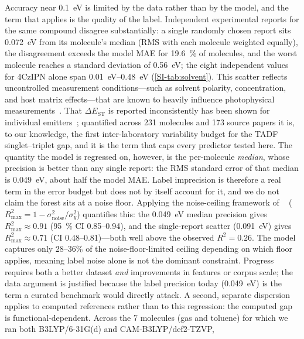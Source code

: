 Accuracy near \qty{0.1}{\electronvolt} is limited by the data rather than by the model,
and the term that applies is the quality of the label.
Independent experimental reports for the same compound disagree
substantially: a single randomly chosen report sits \qty{0.072}{\electronvolt} from its
molecule's median (RMS with each molecule weighted equally), the disagreement exceeds the
model MAE for \qty{19.6}{\percent} of molecules, and the worst molecule reaches a standard
deviation of \qty{0.56}{\electronvolt}; the eight independent values for 4CzIPN alone span
\qtyrange{0.01}{0.48}{\electronvolt} (\cref{SI-tab:solvent}). This scatter reflects uncontrolled measurement conditions---such as solvent polarity, concentration, and host matrix effects---that are known to heavily influence photophysical measurements~\cite{Dang2025}. That $\Delta E_\text{ST}$
is reported inconsistently has been shown for individual emitters~\cite{Shuaib2026};
quantified across \num{231} molecules and \num{173} source papers it is, to our
knowledge, the first inter-laboratory variability budget for the TADF
singlet--triplet gap, and it is the term that caps every predictor tested here.
The quantity the model is regressed on, however, is the per-molecule \emph{median},
whose precision is better than any single report: the RMS standard error of that median
is \qty{0.049}{\electronvolt}, about half the model MAE. Label imprecision is therefore
a real term in the error budget but does not by itself account for it, and we do not
claim the forest sits at a noise floor.
Applying the noise-ceiling framework of \citeauthor{Crusius2025}~\cite{Crusius2025}
($R^2_\text{max} = 1 - \sigma^2_\text{noise}/\sigma^2_y$) quantifies this:
the \qty{0.049}{\electronvolt} median precision gives $R^2_\text{max} \approx 0.91$
(\qty{95}{\percent} CI \numrange{0.85}{0.94}), and the single-report scatter
(\qty{0.091}{\electronvolt}) gives $R^2_\text{max} \approx 0.71$
(CI \numrange{0.48}{0.81})---both well above the observed $R^2 = 0.26$.
The model captures only 28--36\% of the noise-floor-limited ceiling depending on which
floor applies, meaning label noise alone is not the dominant constraint.
Progress requires both a better dataset \emph{and} improvements in features or
corpus scale; the data argument is justified because the label precision today
(\qty{0.049}{\electronvolt}) is the term a curated benchmark would directly attack.
A second, separate dispersion applies to computed references rather than to this
regression: the computed gap is functional-dependent. Across the
\num{7} molecules (gas and toluene) for which we ran both B3LYP/6-31G(d) and CAM-B3LYP/def2-TZVP,
